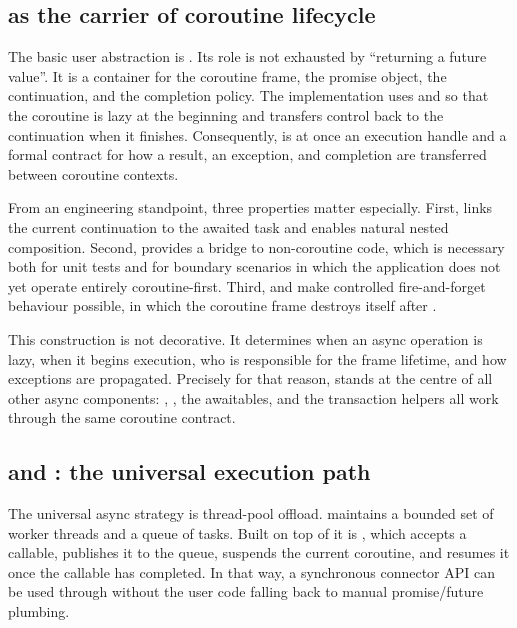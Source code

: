\subsection{ as the carrier of coroutine lifecycle}

The basic user abstraction is . Its role is not exhausted by “returning a future value”. It is a container for the coroutine frame, the promise object, the continuation, and the completion policy. The implementation uses  and  so that the coroutine is lazy at the beginning and transfers control back to the continuation when it finishes. Consequently,  is at once an execution handle and a formal contract for how a result, an exception, and completion are transferred between coroutine contexts.

From an engineering standpoint, three properties matter especially. First,  links the current continuation to the awaited task and enables natural nested  composition. Second,  provides a bridge to non-coroutine code, which is necessary both for unit tests and for boundary scenarios in which the application does not yet operate entirely coroutine-first. Third,  and  make controlled fire-and-forget behaviour possible, in which the coroutine frame destroys itself after .

This construction is not decorative. It determines when an async operation is lazy, when it begins execution, who is responsible for the frame lifetime, and how exceptions are propagated. Precisely for that reason,  stands at the centre of all other async components: , , the  awaitables, and the transaction helpers all work through the same coroutine contract.

\subsection{ and : the universal execution path}

The universal async strategy is thread-pool offload.  maintains a bounded set of worker threads and a queue of tasks. Built on top of it is , which accepts a callable, publishes it to the queue, suspends the current coroutine, and resumes it once the callable has completed. In that way, a synchronous connector API can be used through  without the user code falling back to manual promise/future plumbing.

